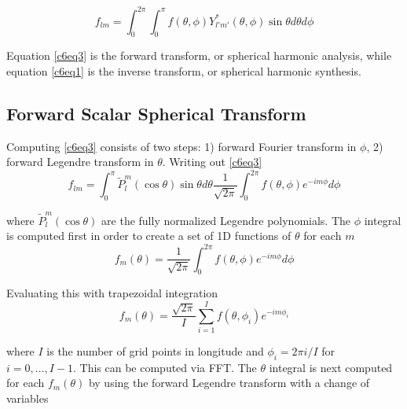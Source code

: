 

\begin{equation}
f_{lm} = \int_{0}^{2\pi} \int_{0}^{\pi}  f(\theta,\phi) Y^*_{l'm'}(\theta,\phi) \sin\theta d\theta d\phi   
\label{c6eq3}
\end{equation}

Equation \eqref{c6eq3} is the forward transform, or spherical harmonic analysis, while equation \eqref{c6eq1} is the inverse transform, or spherical harmonic synthesis.  




\subsection{Forward Scalar Spherical Transform}

Computing \eqref{c6eq3} consists of two steps: 1) forward Fourier transform in $\phi$, 2) forward Legendre transform in $\theta$.  Writing out \eqref{c6eq3}
\begin{equation}
f_{lm} = \int_{0}^{\pi} \widetilde{P}_l^m(\cos \theta) \sin \theta d \theta \dfrac{1}{\sqrt{2\pi}} \int_{0}^{2\pi}   f(\theta,\phi) e^{-im\phi} d\phi   
\end{equation}

\noindent where $\widetilde{P}_l^m(\cos \theta)$ are the fully normalized Legendre polynomials.  The $\phi$ integral is computed first in order to create a set of 1D functions of $\theta$ for each $m$
\begin{equation}
f_m(\theta) = \dfrac{1}{\sqrt{2\pi}} \int_{0}^{2\pi}   f(\theta,\phi) e^{-im\phi} d\phi   
\end{equation}

Evaluating this with trapezoidal integration
\begin{equation}
f_m(\theta) = \dfrac{\sqrt{2\pi}}{I} \sum_{i=1}^{I} f(\theta,\phi_i) e^{-im\phi_i} 
\end{equation}

\noindent where $I$ is the number of grid points in longitude and $\phi_i = 2\pi i/ I $ for $ i = 0,...,I-1$.  This can be computed via FFT. The $\theta$ integral is next computed for each $f_m(\theta)$ by using the forward Legendre transform with a change of variables 

